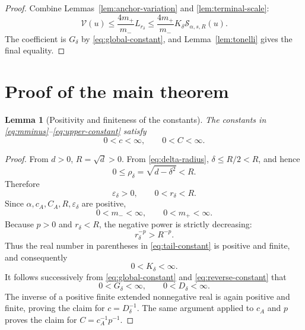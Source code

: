 \documentclass[11pt]{article}
\newtheorem{lemma}[theorem]{Lemma}
\theoremstyle{remark}
\newcommand{\Senergy}{\mathcal S}
\newcommand{\Venergy}{\mathcal V}
\begin{document}
\begin{proof}
Combine Lemmas~\ref{lem:anchor-variation} and
\ref{lem:terminal-scale}:
\[
  \Venergy(u)
  \leq
  \frac{4m_+}{m_-}L_{r_\delta}
  \leq
  \frac{4m_+}{m_-}K_\delta
  \Senergy_{\alpha,s,R}(u).
\]
The coefficient is \(G_\delta\) by
\eqref{eq:global-constant}, and
Lemma~\ref{lem:tonelli} gives the final equality.
\end{proof}

\section{Proof of the main theorem}

\begin{lemma}[Positivity and finiteness of the constants]                 \label{lem:constant-positivity}
The constants in \eqref{eq:mminus}--\eqref{eq:upper-constant} satisfy
\[
  0<c<\infty,\qquad0<C<\infty.
\]
\end{lemma}

\begin{proof}
From \(d>0\), \(R=\sqrt d>0\).  From
\eqref{eq:delta-radius}, \(\delta\leq R/2<R\), and hence
\[
  0\leq\rho_\delta=\sqrt{d-\delta^2}<R.
\]
Therefore
\[
  \varepsilon_\delta>0,
  \qquad
  0<r_\delta<R.
\]
Since \(\alpha,c_A,C_A,R,\varepsilon_\delta\) are positive,
\[
  0<m_-<\infty,\qquad0<m_+<\infty.
\]
Because \(p>0\) and \(r_\delta<R\), the negative power is strictly
decreasing:
\[
  r_\delta^{-p}>R^{-p}.
\]
Thus the real number in parentheses in \eqref{eq:tail-constant} is
positive and finite, and consequently
\[
  0<K_\delta<\infty.
\]
It follows successively from
\eqref{eq:global-constant} and \eqref{eq:reverse-constant} that
\[
  0<G_\delta<\infty,
  \qquad
  0<D_\delta<\infty.
\]
The inverse of a positive finite extended nonnegative real is again positive
and finite, proving the claim for \(c=D_\delta^{-1}\).  The same argument
applied to \(c_A\) and \(p\) proves the claim for
\(C=c_A^{-1}p^{-1}\).
\end{proof}
\end{document}
